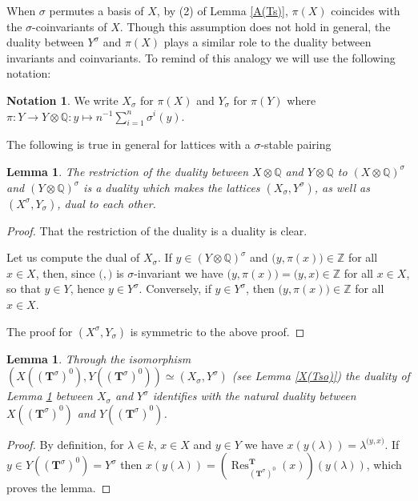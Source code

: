 \documentclass{amsart}
\newtheorem{lemma}[equation]{Lemma}
\numberwithin{equation}{section}
\theoremstyle{definition}
\newtheorem{notation}[equation]{Notation}
\theoremstyle{remark}
\newcommand\bT{{\mathbf T}}
\newcommand\BQ{{\mathbb Q}}
\newcommand\BZ{{\mathbb Z}}
\newcommand\Tso{{(\bT^\sigma)^0}}
\newcommand\inv{^{-1}}
\DeclareMathOperator\Res{\mathrm{Res}}
\newcommand\pairing[2]{{\mathopen(#1,#2\mathclose)}}
\begin{document}
When $\sigma$ permutes a basis of $X$, by
(2) of Lemma \ref{A(Ts)}, $\pi(X)$ coincides with the
$\sigma$-coinvariants of $X$. Though this assumption does not hold
in general, the duality between $Y^\sigma$ and $\pi(X)$ plays a similar role
to the duality between invariants and coinvariants.
To remind of this analogy we will use the following notation:
\begin{notation}
We write $X_\sigma$ for $\pi(X)$ and  
$Y_\sigma$ for $\pi(Y)$ where
$\pi:Y\to Y\otimes\BQ:y\mapsto n\inv\sum_{i=1}^n\sigma^i(y)$.
\end{notation}

The following is true in general for lattices with a $\sigma$-stable pairing
\begin{lemma} \label{XsYs}
The  restriction of the duality  between $X\otimes\BQ$ and $Y\otimes\BQ$ to
$(X\otimes\BQ)^\sigma$  and $(Y\otimes\BQ)^\sigma$ is a duality which makes
the  lattices $(X_\sigma,Y^\sigma)$, as well as $(X^\sigma,Y_\sigma)$, dual
to each other.
\end{lemma}
\begin{proof}
That the restriction of the duality is a duality is clear. 

Let us compute the dual of $X_\sigma$.
If $y\in (Y\otimes\BQ)^\sigma$ and
$\pairing  y{\pi(x)}\in\BZ$ for all $x\in  X$, then, since $\pairing{}{}$ 
is $\sigma$-invariant we have $\pairing y{\pi(x)}=\pairing yx\in\BZ$  
for  all  $x\in X$, so that
$y\in Y$, hence $y\in Y^\sigma$. Conversely, if $y\in Y^\sigma$, then
$\pairing y{\pi(x)}\in\BZ$ for all $x\in  X$.

The proof for $(X^\sigma,Y_\sigma)$ is symmetric to the above proof.
\end{proof}

\begin{lemma}
Through the isomorphism  $(X(\Tso),Y(\Tso))\simeq(X_\sigma,Y^\sigma)$
(see Lemma \ref{X(Tso)}) the duality of Lemma \ref{XsYs}
between $X_\sigma$ and $Y^\sigma$ identifies with the
natural duality between $X(\Tso)$ and $Y(\Tso)$.
\end{lemma}
\begin{proof}
By definition, for $\lambda\in k$, $x\in X$ and $y\in Y$
we have $x(y(\lambda))=\lambda^{\pairing yx}$. 
If $y\in Y(\Tso)=Y^\sigma$ then
$x(y(\lambda))=(\Res^\bT_\Tso(x))(y(\lambda))$, which proves the lemma.
\end{proof}
\end{document}
